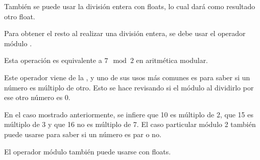 
También se puede usar la división entera con floats, lo cual dará como resultado otro float.


Para obtener el resto al realizar una división entera, se debe usar el operador módulo \ttt{\%}.


Esta operación es equivalente a $7 \mod{2}$ en aritmética modular.\smallskip

Este operador viene de la , y uno de sus usos más comunes es para saber si un número es múltiplo de otro. Esto se hace revisando si el módulo al dividirlo por ese otro número es 0.


En el caso mostrado anteriormente, se infiere que 10 es múltiplo de 2, que 15 es múltiplo de 3 y que 16 no es múltiplo de 7. El caso particular módulo 2 también puede usarse para saber si un número es par o no.\smallskip

El operador módulo \ttt{\%} también puede usarse con floats.


\clearpage